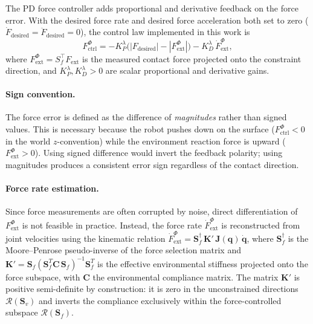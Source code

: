 \documentclass[
	german,%
	accentcolor=9c,%
	ruledheaders=section,%
	class=report,%
	thesis={type=bachelor},%
	fontsize=11pt,%
	parskip=half-,%
	custommargins=true,%
	marginpar=false,%
]{tudapub}
\begin{document}
The PD force controller adds proportional and derivative feedback on the
force error.
With the desired force rate and desired force acceleration both set to zero
(\(\dot{F}_\text{desired} = \ddot{F}_\text{desired} = 0\)), the control law
implemented in this work is
\begin{equation}
    F^\Phi_\text{ctrl}
    = -K_P^\lambda \bigl(|F_\text{desired}| - |F^\Phi_\text{ext}|\bigr)
      - K_D^\lambda\,\dot{F}^\Phi_\text{ext},
    \label{eq:pd_force_impl}
\end{equation}
where \(F^\Phi_\text{ext} = S_f^\top F_\text{ext}\) is the measured contact
force projected onto the constraint direction, and
\(K_P^\lambda, K_D^\lambda > 0\) are scalar proportional and derivative gains.

\paragraph{Sign convention.}
The force error is defined as the difference of \emph{magnitudes} rather than
signed values.
This is necessary because the robot pushes down on the surface
(\(F^\Phi_\text{ctrl} < 0\) in the world \(z\)-convention) while the
environment reaction force is upward
(\(F^\Phi_\text{ext} > 0\)).
Using signed difference would invert the feedback polarity; using magnitudes
produces a consistent error sign regardless of the contact direction.

\paragraph{Force rate estimation.}

Since force measurements are often corrupted by noise, direct differentiation
of $F^\Phi_\text{ext}$ is not feasible in practice. Instead, the force
rate $\dot{F}^\Phi_\text{ext}$ is reconstructed from joint velocities using the kinematic relation
$\dot{F}^\Phi_\text{ext} = \mathbf{S}_{f}^{\dagger}\,\mathbf{K}'\,\mathbf{J}(\mathbf{q})\,\dot{\mathbf{q}}$,
where $\mathbf{S}_{f}^{\dagger}$ is the Moore--Penrose pseudo-inverse of
the force selection matrix and $\mathbf{K}' = \mathbf{S}_{f}(\mathbf{S}_{f}^{T}\mathbf{C}\,\mathbf{S}_{f})^{-1}\mathbf{S}_{f}^{T}$\cite{Siciliano_Sciavicco_Villani_Oriolo_2009}
is the effective environmental stiffness projected onto the force subspace,
with $\mathbf{C}$ the environmental compliance matrix. The matrix $\mathbf{K}'$
is positive semi-definite by construction: it is zero in the unconstrained
directions $\mathcal{R}(\mathbf{S}_{v})$ and inverts the compliance
exclusively within the force-controlled subspace $\mathcal{R}(\mathbf{S}_{f})$.
\end{document}
